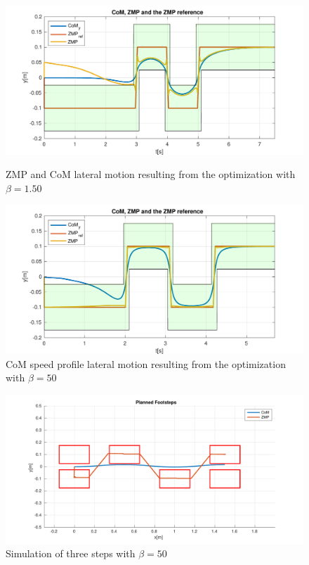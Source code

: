\documentclass[a4paper]{article}
\begin{document}
\begin{figure}
 \begin{minipage}[b]{0.48\textwidth}
         \centering
         \includegraphics[scale=0.4]{plot/OPT_TEMPO/150/opt_y_150_time_noSQD.pdf} 
         \caption{ZMP and CoM lateral motion resulting from the optimization with $\beta=1.50 $} 
         \label{fig:opt_y_150_NO_SQD}
     \end{minipage}
     \hfill
     \begin{minipage}[b]{0.48\textwidth}
         \centering
        \includegraphics[scale=0.4]{plot/OPT_TEMPO/50/opt_y_50_time_noSQD.pdf} 
        \caption{CoM speed profile lateral motion resulting from the optimization with $\beta=50$} 
        \label{fig:opt_y_50_NO_SQD}
     \end{minipage}   

\end{figure}

  
\begin{figure}
         \centering
        \includegraphics[scale=0.6]{plot/optimization/footsteps_com_zmp.pdf}
        \caption{Simulation of three steps with $\beta=50$} 
        \label{fig:steps_NOsqd}
\end{figure}
     
\end{document}
